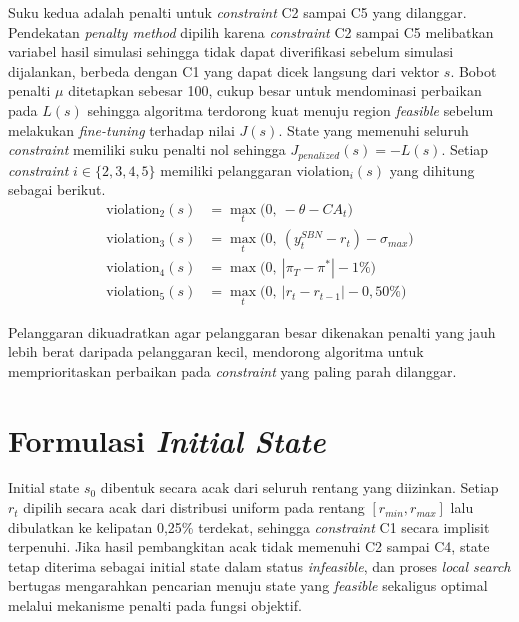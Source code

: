 Suku kedua adalah penalti untuk \textit{constraint} C2 sampai C5 yang dilanggar. Pendekatan \textit{penalty method} dipilih karena \textit{constraint} C2 sampai C5 melibatkan variabel hasil simulasi sehingga tidak dapat diverifikasi sebelum simulasi dijalankan, berbeda dengan C1 yang dapat dicek langsung dari vektor $s$. Bobot penalti $\mu$ ditetapkan sebesar 100, cukup besar untuk mendominasi perbaikan pada $L(s)$ sehingga algoritma terdorong kuat menuju region \textit{feasible} sebelum melakukan \textit{fine-tuning} terhadap nilai $J(s)$. State yang memenuhi seluruh \textit{constraint} memiliki suku penalti nol sehingga $J_{penalized}(s) = -L(s)$. Setiap \textit{constraint} $i \in \{2, 3, 4, 5\}$ memiliki pelanggaran $\text{violation}_i(s)$ yang dihitung sebagai berikut.
\begin{align*}
    \text{violation}_2(s) & = \max_{t}\!\big(0,\ -\theta - CA_t\big)                   \\
    \text{violation}_3(s) & = \max_{t}\!\big(0,\ (y_t^{SBN} - r_t) - \sigma_{max}\big) \\
    \text{violation}_4(s) & = \max\!\big(0,\ |\pi_T - \pi^{*}| - 1\%\big)              \\
    \text{violation}_5(s) & = \max_{t}\!\big(0,\ |r_t - r_{t-1}| - 0{,}50\%\big)
\end{align*}

Pelanggaran dikuadratkan agar pelanggaran besar dikenakan penalti yang jauh lebih berat daripada pelanggaran kecil, mendorong algoritma untuk memprioritaskan perbaikan pada \textit{constraint} yang paling parah dilanggar.


\section{Formulasi \textit{Initial State}}

Initial state $s_0$ dibentuk secara acak dari seluruh rentang yang diizinkan. Setiap $r_t$ dipilih secara acak dari distribusi uniform pada rentang $[r_{min}, r_{max}]$ lalu dibulatkan ke kelipatan 0,25\% terdekat, sehingga \textit{constraint} C1 secara implisit terpenuhi. Jika hasil pembangkitan acak tidak memenuhi C2 sampai C4, state tetap diterima sebagai initial state dalam status \textit{infeasible}, dan proses \textit{local search} bertugas mengarahkan pencarian menuju state yang \textit{feasible} sekaligus optimal melalui mekanisme penalti pada fungsi objektif.

